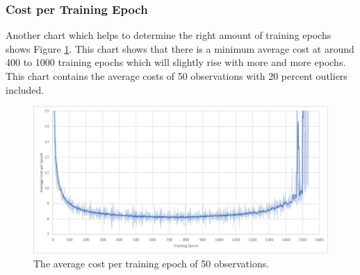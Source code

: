 \documentclass[MGS,Master,english]{twbook}%
\begin{document}
\subsubsection{Cost per Training Epoch}
Another chart which helps to determine the right amount of training epochs shows Figure \ref{fig::vae::costPerEpoch}. This chart shows that there is a minimum average cost at around 400 to 1000 training epochs which will slightly rise with more and more epochs. This chart contains the average costs of 50 observations with 20 percent outliers included.
\begin{figure}[!ht]
	\centering
	\includegraphics[width=1.0\linewidth]{PICs/trained_vae/cost_per_epoch}
	\caption{The average cost per training epoch of 50 observations.} \label{fig::vae::costPerEpoch}
\end{figure}
\end{document}
